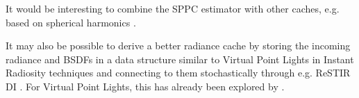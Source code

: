 It would be interesting to combine the SPPC estimator with other caches, e.g. based on spherical harmonics \parencite{krivanek2005}.

It may also be possible to derive a better radiance cache by storing the incoming radiance and BSDFs in a data structure similar to Virtual Point Lights in Instant Radiosity techniques \parencite{keller1997} and connecting to them stochastically through e.g. ReSTIR DI \parencite{bitterli2020}.
For Virtual Point Lights, this has already been explored by \textcite{bruin2025}.